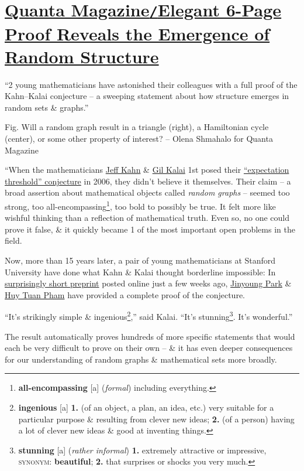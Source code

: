 \documentclass[oneside]{book}
\numberwithin{equation}{section}
\begin{document}
\section{\href{https://www.quantamagazine.org/elegant-six-page-proof-reveals-the-emergence-of-random-structure-20220425/}{Quanta Magazine\texttt{/}Elegant 6-Page Proof Reveals the Emergence of Random Structure}}
``2 young mathematicians have astonished their colleagues with a full proof of the Kahn--Kalai conjecture -- a sweeping statement about how structure emerges in random sets \& graphs.''

\textsf{Fig. Will a random graph result in a triangle (right), a Hamiltonian cycle (center), or some other property of interest?} -- Olena Shmahalo for Quanta Magazine

``When the mathematicians \href{https://sites.math.rutgers.edu/~jkahn/}{Jeff Kahn} \& \href{http://www.ma.huji.ac.il/~kalai/}{Gil Kalai} 1st posed their \href{https://arxiv.org/abs/math/0603218}{``expectation threshold'' conjecture} in 2006, they didn't believe it themselves. Their claim -- a broad assertion about mathematical objects called \textit{random graphs} -- seemed too strong, too all-encompassing\footnote{\textbf{all-encompassing} [a] (\textit{formal}) including everything.}, too bold to possibly be true. It felt more like wishful thinking than a reflection of mathematical truth. Even so, no one could prove it false, \& it quickly became 1 of the most important open problems in the field.

Now, more than 15 years later, a pair of young mathematicians at Stanford University have done what Kahn \& Kalai thought borderline impossible: In \href{https://arxiv.org/abs/2203.17207}{surprisingly short preprint} posted online just a few weeks ago, \href{https://sites.google.com/view/jinyoungpark}{Jinyoung Park} \& \href{https://web.stanford.edu/~huypham/}{Huy Tuan Pham} have provided a complete proof of the conjecture.

``It's strikingly simple \& ingenious\footnote{\textbf{ingenious} [a] \textbf{1.} (of an object, a plan, an idea, etc.) very suitable for a particular purpose \& resulting from clever new ideas; \textbf{2.} (of a person) having a lot of clever new ideas \& good at inventing things.},'' said Kalai. ``It's stunning\footnote{\textbf{stunning} [a] (\textit{rather informal}) \textbf{1.} extremely attractive or impressive, \textsc{synonym}: \textbf{beautiful}; \textbf{2.} that surprises or shocks you very much.}. It's wonderful.''

The result automatically proves hundreds of more specific statements that would each be very difficult to prove on their own -- \& it has even deeper consequences for our understanding of random graphs \& mathematical sets more broadly.
\end{document}
